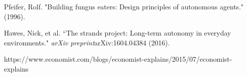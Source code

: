 \documentclass[letterpaper, 10 pt, conference]{ieeeconf}  %
\begin{document}
\begin{thebibliography}{99}

 Pfeifer, Rolf. "Building fungus eaters: Design principles of autonomous agents." (1996).

 Hawes, Nick, et al. ``The strands project: Long-term autonomy in everyday environments." \textit{arXiv preprint}arXiv:1604.04384 (2016).

 https://www.economist.com/blogs/economist-explains/2015/07/economist-explains 

\end{thebibliography}
\end{document}
